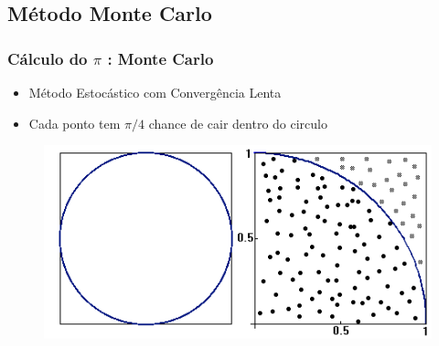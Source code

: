 \documentclass{beamer}
\newcommand\safepi[0]{
	\texorpdfstring{$\pi$}{Pi}
}
\begin{document}
\begin{frame}

\subsection{Método Monte Carlo}
\frametitle{Cálculo do \safepi: Monte Carlo}
	
\begin{itemize}
    \item Método Estocástico com Convergência Lenta
    \item Cada ponto tem $\pi/4$ chance de cair dentro do circulo
\end{itemize}

\begin{figure}
	\includegraphics[width=0.8\linewidth]{fig01.png}
\end{figure}
			
\end{frame}

\end{document}
